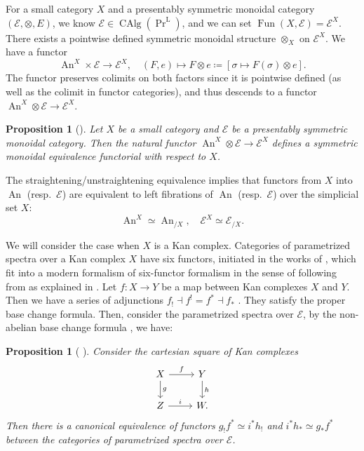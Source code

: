 \documentclass[11pt]{amsart}
\numberwithin{equation}{section}
\theoremstyle{plain}
\newtheorem{Prop}[prop]{Proposition}
\theoremstyle{definition}
\theoremstyle{remark}
\newcommand{\cE} { {\mathcal{E}}}
\newcommand\Fun{\operatorname{Fun}}
\newcommand\CAlg{ {\operatorname{CAlg}} }
\newcommand\PrL{  {  \operatorname{Pr}^{\operatorname{L} }  } }
\newcommand\An{ {\operatorname{An} } }
\begin{document}
For a small category $X$ and a presentably symmetric monoidal category $(\cE, \otimes, E)$, we know $\cE \in \CAlg(\PrL)$, and we can set $\Fun(X,\cE)=\cE^X$. There exists a pointwise defined symmetric monoidal structure $\otimes_X$ on $\cE^X$. We have a functor
\[\An^X \times \cE \rightarrow \cE^X,\quad (F,e)\mapsto F\otimes e \coloneqq [\sigma \mapsto  F(\sigma)\otimes e]. \]
The functor preserves colimits on both factors since it is pointwise defined (as well as the colimit in functor categories), and thus descends to a functor $\An^X \otimes \cE \rightarrow \cE^X$.

\begin{Prop}[{\cite[Proposition 4.8.1.17]{HA}}]\label{prop:base-change}
Let $X$ be a small category and $\cE$ be a presentably symmetric monoidal category. Then the natural functor $\An^X \otimes \cE \to \cE^X$ defines a symmetric monoidal equivalence functorial with respect to $X$.
\end{Prop}

The straightening/unstraightening equivalence \cite[Theorem 3.2.0.1]{HTT} implies that functors from $X$ into $\An$ (resp.~$\cE$) are equivalent to left fibrations of $\An$ (resp.~$\cE$) over the simplicial set $X$:
\begin{equation}\label{eq:straighten}
\An^X \simeq \An_{/X}, \quad \cE^X \simeq \cE_{/X}.
\end{equation}

We will consider the case when $X$ is a Kan complex. Categories of parametrized spectra over a Kan complex $X$ have six functors, initiated in the works of \cite{AndoBlumbergGepner,AndoBlumbergGepnerHopkinsRezk}, which fit into a modern formalism of six-functor formalism in the sense of \cite[Definition A.5.7]{Mann} following from \cite[Proposition A.5.10]{Mann} as explained in \cite[Section 3]{HesselholtFF}. Let $f: X \to Y$ be a map between Kan complexes $X$ and $Y$. Then we have a series of adjunctions $f_! \dashv f^! = f^* \dashv f_*$ \cite[Section 5.5]{AndoBlumbergGepner} \cite[Section 3]{HesselholtFF}. They satisfy the proper base change formula. Then, consider the parametrized spectra over $\cE$, by the non-abelian base change formula \cite[Theorem 0.5]{HaineBasechange}, we have:

\begin{Prop}[{\cite[Proposition 5.12]{AndoBlumbergGepner} \cite[Theorem 0.5]{HaineBasechange}}]\label{lem:base-change}
Consider the cartesian square of Kan complexes
\[\begin{tikzcd}
    X \ar[r,"f"] \ar[d,"g"] & Y \ar[d,"h"] \\
    Z \ar[r,"i"] & W.
\end{tikzcd}\]
Then there is a canonical equivalence of functors $g_!f^* \simeq i^*h_!$ and $i^*h_* \simeq g_*f^*$ between the categories of parametrized spectra over $\cE$.
\end{Prop}
\end{document}
